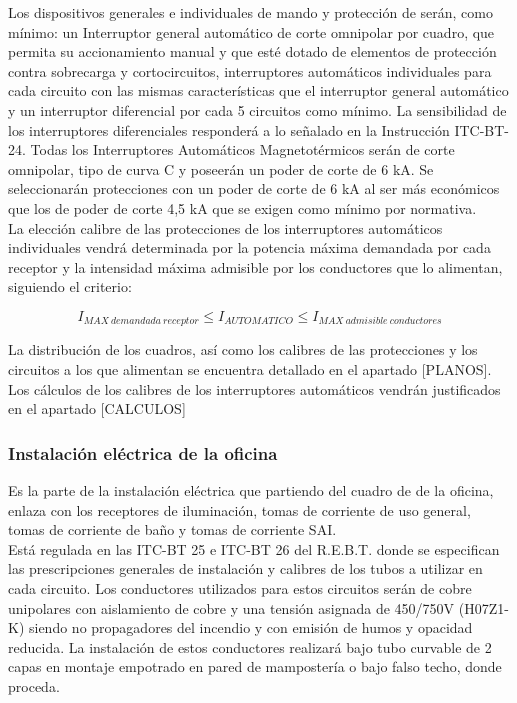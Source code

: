 Los dispositivos generales e individuales de mando y protección de serán, como mínimo: un Interruptor general automático de corte omnipolar por cuadro, que permita su accionamiento manual y que esté dotado de elementos de protección contra sobrecarga y cortocircuitos, interruptores automáticos individuales para cada circuito con las mismas características que el interruptor general automático y un interruptor diferencial por cada 5 circuitos como mínimo. La sensibilidad de los interruptores diferenciales responderá a lo señalado en la Instrucción ITC-BT-24. Todas los Interruptores Automáticos Magnetotérmicos serán de corte omnipolar, tipo de curva C y poseerán un poder de corte de 6 kA. Se seleccionarán protecciones con un poder de corte de 6 kA al ser más económicos que los de poder de corte 4,5 kA que se exigen como mínimo por normativa.\\

La elección calibre de las protecciones de los interruptores automáticos individuales vendrá determinada por la potencia máxima demandada por cada receptor y la intensidad máxima admisible por los conductores que lo alimentan, siguiendo el criterio:\

$$ I_{MAX\ demandada\ receptor}\leq I_{AUTOMATICO}\leq I_{MAX\ admisible\ conductores}$$

La distribución de los cuadros, así como los calibres de las protecciones y los circuitos a los que alimentan se encuentra detallado en el apartado [PLANOS]. Los cálculos de los calibres de los interruptores automáticos vendrán justificados en el apartado [CALCULOS]

\subsubsection{Instalación eléctrica de la oficina}

Es la parte de la instalación eléctrica que partiendo del cuadro de de la oficina, enlaza con los receptores de iluminación, tomas de corriente de uso general, tomas de corriente de baño y tomas de corriente SAI.\\

Está regulada en las ITC-BT 25 e ITC-BT 26 del R.E.B.T. donde se especifican las prescripciones generales de instalación y calibres de los tubos a utilizar en cada circuito. Los conductores utilizados para estos circuitos serán de cobre unipolares con aislamiento de cobre y una tensión asignada de 450/750V (H07Z1-K) siendo no propagadores del incendio y con emisión de humos y opacidad reducida. La instalación de estos conductores realizará bajo tubo curvable de 2 capas en montaje empotrado en pared de mampostería o bajo falso techo, donde proceda.\\


